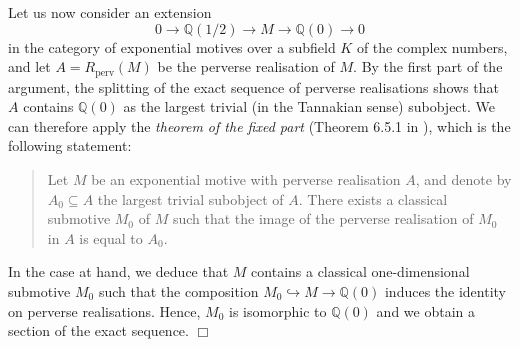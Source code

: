 \documentclass[12pt,leqno]{article}
\newcommand{\Q}{{\mathbb{Q}}}
\newcommand{\perv}{\mathrm{perv}}
\newenvironment{proof}{\noindent {\bf Proof}}{\mbox{}\hspace*{\fill}$\Box$}
\begin{document}
\begin{proof}
Let us now consider an extension 
\[
0 \longrightarrow \Q (1/2) \longrightarrow M \longrightarrow \Q (0) \longrightarrow 0
\]
in the category of exponential motives over a subfield $K$ of the complex numbers, and let $A = R_{\perv} (M )$ be the perverse realisation of $M$. By the first part of the argument, the splitting of the exact sequence of perverse realisations shows that $A$ contains $\Q (0)$ as the largest trivial (in the Tannakian sense) subobject. We can therefore apply the \textit{theorem of the fixed part} (Theorem 6.5.1 in \cite{FJ}), which is the following statement:
\begin{quote}
Let $M$ be an exponential motive with perverse realisation $A$, and denote by $A_0 \subseteq A$ the largest trivial subobject of $A$. There exists a classical submotive $M_0$ of $M$ such that the image of the perverse realisation of $M_0$ in $A$ is equal to $A_0$.
\end{quote}
In the case at hand, we deduce that $M$ contains a classical one-dimensional submotive $M_0$ such that the composition $M_0 \hookrightarrow M \to \Q (0)$ induces the identity on perverse realisations. Hence, $M_0$ is isomorphic to $\Q (0)$ and we obtain a section of the exact sequence. 
\end{proof}
%
\end{document}

